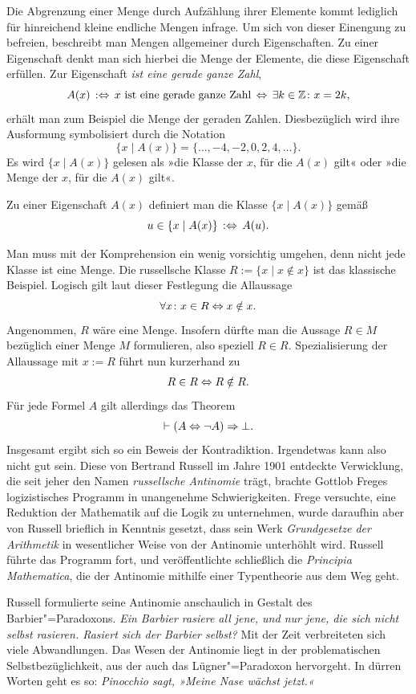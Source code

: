 Die Abgrenzung einer Menge durch Aufzählung ihrer Elemente kommt
lediglich für hinreichend kleine endliche Mengen infrage. Um sich von
dieser Einengung zu befreien, beschreibt man Mengen allgemeiner durch
Eigenschaften. Zu einer Eigenschaft denkt man sich hierbei die Menge der
Elemente, die diese Eigenschaft erfüllen. Zur Eigenschaft
\emph{ist eine gerade ganze Zahl},
\[A(x)\,:\Leftrightarrow\,\text{$x$ ist eine gerade ganze Zahl}\,
\Leftrightarrow\,\exists k\in\mathbb Z\colon x=2k,\]
erhält man zum Beispiel die Menge der geraden Zahlen. Diesbezüglich wird
ihre Ausformung symbolisiert durch die Notation
\[\{x\mid A(x)\} = \{\ldots,-4,-2,0,2,4,\ldots\}.\]
Es wird $\{x\mid A(x)\}$ gelesen als »die Klasse der $x$, für die
$A(x)$ gilt« oder »die Menge der $x$, für die $A(x)$ gilt«.
\begin{Definition}[Komprehension]%
\label{def:Komprehension}\newlinefirst
Zu einer Eigenschaft $A(x)$ definiert man die Klasse
$\{x\mid A(x)\}$ gemäß
\[u\in\{x\mid A(x)\}\,:\Leftrightarrow\, A(u).\]
\end{Definition}
Man muss mit der Komprehension ein wenig vorsichtig umgehen, denn nicht
jede Klasse ist eine Menge. Die russellsche Klasse $R := \{x\mid x\notin x\}$
ist das klassische Beispiel. Logisch gilt laut dieser Festlegung die
Allaussage
\[\forall x\colon x\in R\Leftrightarrow x\notin x.\]
Angenommen, $R$ wäre eine Menge. Insofern dürfte man die Aussage
$R\in M$ bezüglich einer Menge $M$ formulieren, also speziell $R\in R$.
Spezialisierung der Allaussage mit $x:=R$ führt nun kurzerhand zu
\[R\in R\Leftrightarrow R\notin R.\]
Für jede Formel $A$ gilt allerdings das Theorem
\[\vdash (A\Leftrightarrow\lnot A)\Rightarrow\bot.\]
Insgesamt ergibt sich so ein Beweis der Kontradiktion. Irgendetwas kann
also nicht gut sein. Diese von Bertrand Russell
im Jahre 1901 entdeckte Verwicklung, die seit jeher den Namen
\emph{russellsche Antinomie} trägt, brachte
Gottlob Freges logizistisches Programm in unangenehme
Schwierigkeiten. Frege versuchte, eine Reduktion der Mathematik auf die
Logik zu unternehmen, wurde daraufhin aber von Russell brieflich in
Kenntnis gesetzt, dass sein Werk \emph{Grundgesetze der Arithmetik} in
wesentlicher Weise von der Antinomie unterhöhlt wird. Russell führte das
Programm fort, und veröffentlichte schließlich die
\emph{Principia Mathematica}, die der
Antinomie mithilfe einer Typentheorie aus dem Weg geht.
\cite{Coquand-Type-Theory}

Russell formulierte seine Antinomie anschaulich in Gestalt des
Barbier"=Paradoxons. \emph{Ein Barbier rasiere all jene, und nur jene, die
sich nicht selbst rasieren. Rasiert sich der Barbier selbst?}
Mit der Zeit verbreiteten sich viele Abwandlungen. Das Wesen der
Antinomie liegt in der problematischen Selbstbezüglichkeit, aus der
auch das Lügner"=Paradoxon
hervorgeht. In dürren Worten geht es so:
\emph{Pinocchio sagt, »Meine Nase wächst jetzt.«}


